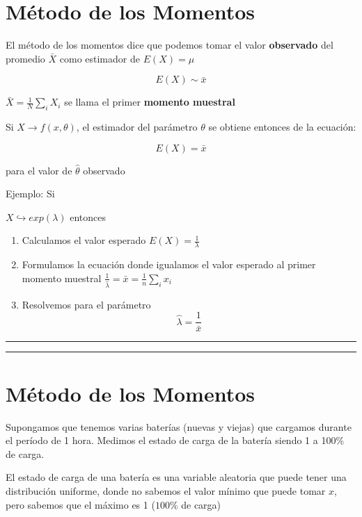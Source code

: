 \documentclass[
]{book}
\begin{document}
\hypertarget{muxe9todo-de-los-momentos-2}{%
\section{Método de los Momentos}\label{muxe9todo-de-los-momentos-2}}

El método de los momentos dice que podemos tomar el valor \textbf{observado} del promedio \(\bar{X}\) como estimador de \(E(X)=\mu\)

\[E(X) \sim\bar{x}\]

\(\bar{X}=\frac{1}{N}\sum_i X_i\) se llama el primer \textbf{momento muestral}

Si \(X \rightarrow f(x, \theta)\), el estimador del parámetro \(\theta\) se obtiene entonces de la ecuación:

\[E(X)=\bar{x}\]

para el valor de \(\hat{\theta}\) observado

Ejemplo: Si

\(X \hookrightarrow exp(\lambda)\) entonces

\begin{enumerate}
\def\labelenumi{\arabic{enumi}.}
\item
  Calculamos el valor esperado \(E(X)=\frac{1}{\lambda}\)
\item
  Formulamos la ecuación donde igualamos el valor esperado al primer momento muestral \(\frac{1}{\hat{\lambda}}=\bar{x}=\frac{1}{n}\sum_i x_i\)
\item
  Resolvemos para el parámetro \[\hat{\lambda}=\frac{1}{\bar{x}}\]
\end{enumerate}

\begin{center}\rule{0.5\linewidth}{0.5pt}\end{center}

\begin{center}\rule{0.5\linewidth}{0.5pt}\end{center}

\hypertarget{muxe9todo-de-los-momentos-3}{%
\section{Método de los Momentos}\label{muxe9todo-de-los-momentos-3}}

Supongamos que tenemos varias baterías (nuevas y viejas) que cargamos durante el período de 1 hora. Medimos el estado de carga de la batería siendo 1 a 100\% de carga.

El estado de carga de una batería es una variable aleatoria que puede tener una distribución uniforme, donde no sabemos el valor mínimo que puede tomar \(x\), pero sabemos que el máximo es 1 (\(100\%\) de carga)
\end{document}
